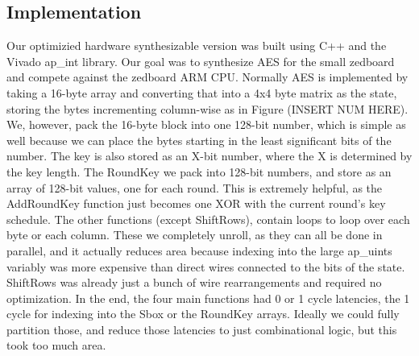 \subsection{Implementation}
Our optimizied hardware synthesizable version was built using C++ and the Vivado ap\_int library. Our goal was to synthesize AES for the small zedboard and compete against the zedboard ARM CPU. Normally AES is implemented by taking a 16-byte array and converting that into a 4x4 byte matrix as the state, storing the bytes incrementing column-wise as in Figure (INSERT NUM HERE). We, however, pack the 16-byte block into one 128-bit number, which is simple as well because we can place the bytes starting in the least significant bits of the number. The key is also stored as an X-bit number, where the X is determined by the key length. The RoundKey we pack into 128-bit numbers, and store as an array of 128-bit values, one for each round. This is extremely helpful, as the AddRoundKey function just becomes one XOR with the current round's key schedule. The other functions (except ShiftRows), contain loops to loop over each byte or each column. These we completely unroll, as they can all be done in parallel, and it actually reduces area because indexing into the large ap\_uints variably was more expensive than direct wires connected to the bits of the state. ShiftRows was already just a bunch of wire rearrangements and required no optimization. In the end, the four main functions had 0 or 1 cycle latencies, the 1 cycle for indexing into the Sbox or the RoundKey arrays. Ideally we could fully partition those, and reduce those latencies to just combinational logic, but this took too much area. 

